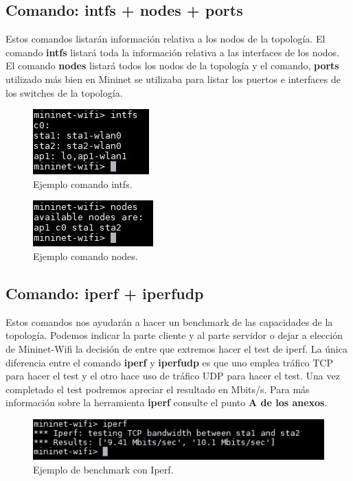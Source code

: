 \subsection{Comando: intfs + nodes + ports}
Estos comandos listarán información relativa a los nodos de la topología. El comando \textbf{intfs} listará toda la información relativa a las interfaces de los nodos. El comando \textbf{nodes} listará todos los nodos de la topología y el comando, \textbf{ports} utilizado más bien en Mininet se utilizaba para listar los puertos e interfaces de los switches  de la topología. 
 \begin{figure}[!htb]
  \centering
    \includegraphics[width=0.4\linewidth]{./img/cli/5.JPG}
    \caption{Ejemplo comando intfs.}
  \label{fig:yo}
\end{figure}
 \begin{figure}[!htb]
  \centering
    \includegraphics[width=0.4\linewidth]{./img/cli/6.JPG}
    \caption{Ejemplo comando nodes.}
  \label{fig:yo}
\end{figure}
\subsection{Comando: iperf + iperfudp}
Estos comandos nos ayudarán a hacer un benchmark de las capacidades de la topología. Podemos indicar la parte cliente y al parte servidor o dejar a elección de Mininet-Wifi la decisión de entre que extremos hacer el test de iperf. La única diferencia entre el comando \textbf{iperf} y \textbf{iperfudp} es que uno emplea tráfico TCP para hacer el test y el otro hace uso de tráfico UDP para hacer el test. Una vez completado el test podremos apreciar el resultado en Mbits/s. Para más información sobre la herramienta \textbf{iperf} consulte el punto \textbf{A de los anexos}. \newline
\newline
 \begin{figure}[!htb]
  \centering
    \includegraphics[width=0.7\linewidth]{./img/cli/7_a.JPG}
    \caption{Ejemplo de benchmark con Iperf.}
  \label{fig:yo}
\end{figure}
\newpage
